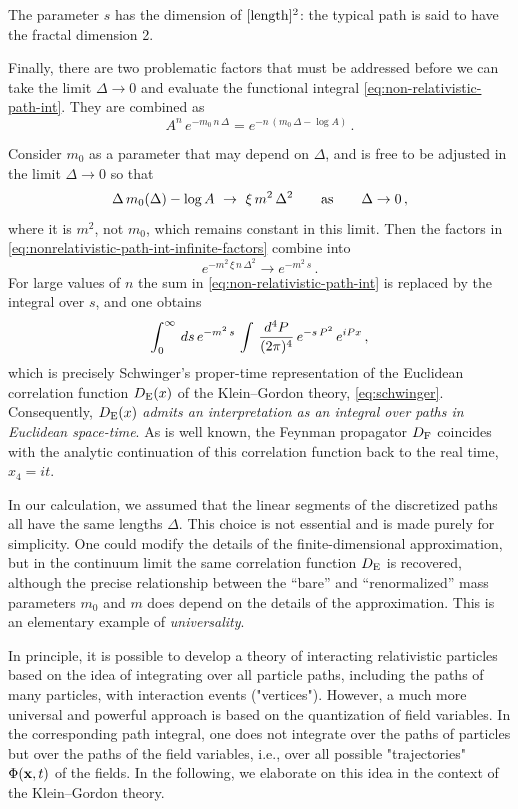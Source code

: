 The parameter $s$ has the dimension of $[{\rm length}]^2$: the typical path is said to have the fractal dimension 2.

Finally, there are two problematic factors that must be addressed before we can take the limit $\Delta\to 0$ and evaluate the functional integral \eqref{eq:non-relativistic-path-int}. They are combined as
\begin{equation}
    A^n\,e^{-m_0\,n\,\Delta} = e^{-n\,(m_0\,\Delta - \log A)}\,.
    \label{eq:nonrelativistic-path-int-infinite-factors}
\end{equation}

Consider $m_0$ as a parameter that may depend on $\Delta$, and is free to be adjusted in the limit $\Delta \to 0$ so that
$$
\Delta\,m_0 (\Delta) - \log A \ \to\  \xi\,{m^2}\,\Delta^2 \qquad {\rm
as}\qquad \Delta\to 0\,,
$$
where it is $m^2$, not $m_0$, which remains constant in this limit. Then the factors in \eqref{eq:nonrelativistic-path-int-infinite-factors} combine into
$$
e^{-m^2\,{\xi\,{n\,\Delta^2}}} \to e^{-m^2\,s}\,.
$$
For large values of $n$ the sum in \eqref{eq:non-relativistic-path-int} is replaced by the integral over $s$, and one obtains
$$
\int_{0}^{\infty}\,ds\,e^{-m^2\,s}\,\int\,{{d^4 P}\over{(2\pi)^4}}\,e^{-s\,P^2} \,e^{iPx}\,,
$$
which is precisely Schwinger’s proper-time representation of the Euclidean correlation function $D_{\rm E}(x)$ of the Klein–Gordon theory, \eqref{eq:schwinger}. Consequently, $D_{\rm E}(x)$ \emph{admits an interpretation as an integral over paths in Euclidean space-time}. As is well known, the Feynman propagator $D_{\rm F}$ coincides with the analytic continuation of this correlation function back to the real time, $x_4 = it$.


\begin{remarkbox}
    In our calculation, we assumed that the linear segments of the discretized paths all have the same lengths $\Delta$. This choice is not essential and is made purely for simplicity. One could modify the details of the finite-dimensional approximation, but in the continuum limit the same correlation function $D_{\rm E}$ is recovered, although the precise relationship between the ``bare'' and ``renormalized'' mass parameters $m_0$ and $m$ does depend on the details of the approximation. This is an elementary example of {\it universality}.
\end{remarkbox}


In principle, it is possible to develop a theory of interacting relativistic particles based on the idea of integrating over all particle paths, including the paths of many particles, with interaction events ("vertices"). However, a much more universal and powerful approach is based on the quantization of field variables. In the corresponding path integral, one does not integrate over the paths of particles but over the paths of the field variables, i.e., over all possible "trajectories" $\Phi({\bf x},t)$ of the fields. In the following, we elaborate on this idea in the context of the Klein–Gordon theory.
